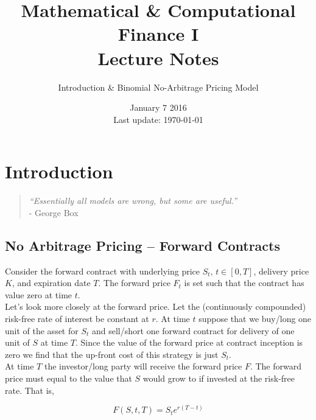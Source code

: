 \documentclass[12pt]{article}
\newlength\tindent
\renewcommand{\indent}{\hspace*{\tindent}}
\begin{document}
 
 
\title{Mathematical \& Computational Finance I\\Lecture Notes}
\author{Introduction \& Binomial No-Arbitrage Pricing Model}
\date{January 7 2016 \\ Last update: \today{}}
\maketitle

\section{Introduction}

\begin{quote} 
\centering 
{\em ``Essentially all models are wrong, but some are useful.'' } \\
\hfill - George Box
\end{quote}

\subsection{No Arbitrage Pricing -- Forward Contracts}

\indent Consider the forward contract with underlying price $S_t,\,t\in[0,T]$, delivery price $K$, and expiration date $T$. The forward price $F_t$ is set such that the contract has value zero at time $t$. \\

\indent Let's look more closely at the forward price. Let the (continuously compounded) risk-free rate of interest be constant at $r$. At time $t$ suppose that we buy/long one unit of the asset for $S_t$ and sell/short one forward contract for delivery of one unit of $S$ at time $T$. Since the value of the forward price at contract inception is zero we find that the up-front cost of this strategy is just $S_t$. \\

\indent At time $T$ the investor/long party will receive the forward price $F$. The forward price must equal to the value that $S$ would grow to if invested at the risk-free rate. That is,

\begin{equation*}
	F(S,t,T) = S_t e^{r(T - t)}
\end{equation*}
\end{document}
